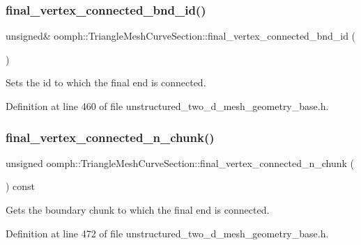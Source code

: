 \subsubsection{\texorpdfstring{final\+\_\+vertex\+\_\+connected\+\_\+bnd\+\_\+id()}{final\_vertex\_connected\_bnd\_id()}\hspace{0.1cm}{\footnotesize\ttfamily [2/2]}}
{\footnotesize\ttfamily unsigned\& oomph\+::\+Triangle\+Mesh\+Curve\+Section\+::final\+\_\+vertex\+\_\+connected\+\_\+bnd\+\_\+id (\begin{DoxyParamCaption}{ }\end{DoxyParamCaption})\hspace{0.3cm}{\ttfamily [inline]}}



Sets the id to which the final end is connected. 



Definition at line 460 of file unstructured\+\_\+two\+\_\+d\+\_\+mesh\+\_\+geometry\+\_\+base.\+h.

\mbox{\label{classoomph_1_1TriangleMeshCurveSection_a5a313270409b3ea9abde6ed7c6c65568}} 
\subsubsection{\texorpdfstring{final\+\_\+vertex\+\_\+connected\+\_\+n\+\_\+chunk()}{final\_vertex\_connected\_n\_chunk()}\hspace{0.1cm}{\footnotesize\ttfamily [1/2]}}
{\footnotesize\ttfamily unsigned oomph\+::\+Triangle\+Mesh\+Curve\+Section\+::final\+\_\+vertex\+\_\+connected\+\_\+n\+\_\+chunk (\begin{DoxyParamCaption}{ }\end{DoxyParamCaption}) const\hspace{0.3cm}{\ttfamily [inline]}}



Gets the boundary chunk to which the final end is connected. 



Definition at line 472 of file unstructured\+\_\+two\+\_\+d\+\_\+mesh\+\_\+geometry\+\_\+base.\+h.




